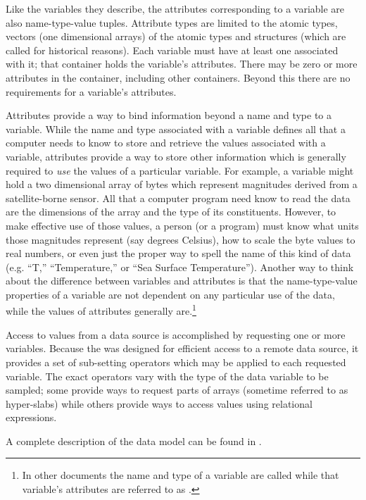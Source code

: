 \documentclass[justify]{dods-paper}
\begin{document}

Like the variables they describe, the attributes corresponding to a
variable are also name-type-value tuples.  Attribute types are limited
to the atomic types, vectors (one dimensional arrays) of the atomic
types and structures (which are called  for historical
reasons). Each variable must have at least one  associated with it; that container holds the variable's
attributes. There may be zero or more attributes in the container,
including other containers. Beyond this there are no requirements for
a variable's attributes.

Attributes provide a way to bind information beyond a name and type to
a variable. While the name and type associated with a variable defines
all that a computer needs to know to store and retrieve the values
associated with a variable, attributes provide a way to store other
information which is generally required to \emph{use} the values of a
particular variable.  For example, a variable might hold a two
dimensional array of bytes which represent magnitudes derived from a
satellite-borne sensor.  All that a computer program need know to read
the data are the dimensions of the array and the type of its
constituents.  However, to make effective use of those values, a
person (or a program) must know what units those magnitudes represent
(say degrees Celsius), how to scale the byte values to real numbers,
or even just the proper way to spell the name of this kind of data
(e.g. ``T,'' ``Temperature,'' or ``Sea Surface Temperature'').
Another way to think about the difference between variables and
attributes is that the name-type-value properties of a variable are
not dependent on any particular use of the data, while the values of
attributes generally are.\footnote{In other documents the name and
  type of a variable are called  while
  that variable's attributes are referred to as
  .}

Access to values from a data source is accomplished by requesting one
or more variables. Because the \DAP was designed for efficient access
to a remote data source, it provides a set of sub-setting operators
which may be applied to each requested variable.  The exact operators
vary with the type of the data variable to be sampled; some provide
ways to request parts of arrays (sometime referred to as hyper-slabs)
while others provide ways to access values using relational
expressions.

A complete description of the \DAP data model can be found in
  \DAPObjects .
\end{document}
